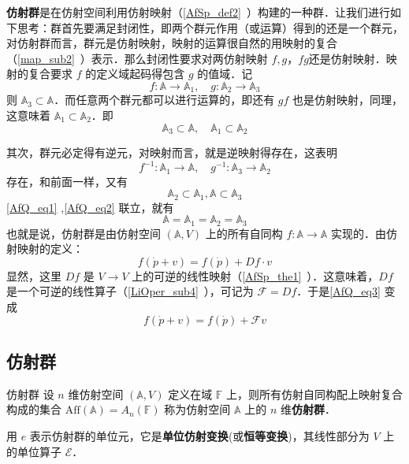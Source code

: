 
\textbf{仿射群}是在仿射空间利用仿射映射（\autoref{AfSp_def2}~）构建的一种群．让我们进行如下思考：群首先要满足封闭性，即两个群元作用（或运算）得到的还是一个群元，对仿射群而言，群元是仿射映射，映射的运算很自然的用映射的复合（\autoref{map_sub2}~）表示．那么封闭性要求对两仿射映射 $f,g$，$fg$还是仿射映射．映射的复合要求 $f$ 的定义域起码得包含 $g$ 的值域．记
 \begin{equation}
f:\mathbb A\rightarrow\mathbb A_1,\quad g:\mathbb A_2\rightarrow \mathbb A_3
 \end{equation}
 则 $\mathbb A_3\subset \mathbb A$．而任意两个群元都可以进行运算的，即还有 $gf$ 也是仿射映射，同理，这意味着 $\mathbb A_1\subset\mathbb A_2$．即
 \begin{equation}\label{AfQ_eq1}
 \mathbb A_3\subset \mathbb A,\quad \mathbb A_1\subset\mathbb A_2
 \end{equation}
 
 其次，群元必定得有逆元，对映射而言，就是逆映射得存在，这表明
\begin{equation}
 f^{-1}:\mathbb A_1\rightarrow\mathbb A,\quad g^{-1}:\mathbb A_3\rightarrow\mathbb A_2
\end{equation}
 存在，和前面一样，又有
 \begin{equation}\label{AfQ_eq2}
 \mathbb A_2\subset \mathbb A_1, \mathbb A\subset\mathbb A_3
 \end{equation}
 \autoref{AfQ_eq1} ,\autoref{AfQ_eq2} 联立，就有
 \begin{equation}
 \mathbb A=\mathbb A_1= \mathbb A_2=\mathbb A_3
 \end{equation}
 也就是说，仿射群是由仿射空间 $(\mathbb A,V)$ 上的所有自同构 $f:\mathbb A\rightarrow\mathbb A$ 实现的．由仿射映射的定义：
 \begin{equation}\label{AfQ_eq3}
 f(\dot p+v)=f(\dot p)+Df\cdot v
 \end{equation}
 显然，这里 $Df$ 是 $V\rightarrow V$ 上的可逆的线性映射（\autoref{AfSp_the1}~）．这意味着，$Df$ 是一个可逆的线性算子（\autoref{LiOper_sub4}~），可记为 $\mathcal F=Df$．于是\autoref{AfQ_eq3} 变成
 \begin{equation}
 f(\dot p+v)=f(\dot p)+\mathcal F v
 \end{equation}
 \subsection{仿射群}
 \begin{definition}{仿射群}
 设 $n$ 维仿射空间 $(\mathbb A,V)$ 定义在域 $\mathbb F$ 上，则所有仿射自同构配上映射复合构成的集合 $\mathrm{Aff}(\mathbb A)=A_n(\mathbb F)$ 称为仿射空间 $\mathbb A$ 上的 $n$ 维\textbf{仿射群}．
 \end{definition}
 用 $e$ 表示仿射群的单位元，它是\textbf{单位仿射变换}(或\textbf{恒等变换})，其线性部分为 $V$ 上的单位算子 $\mathcal E$．

